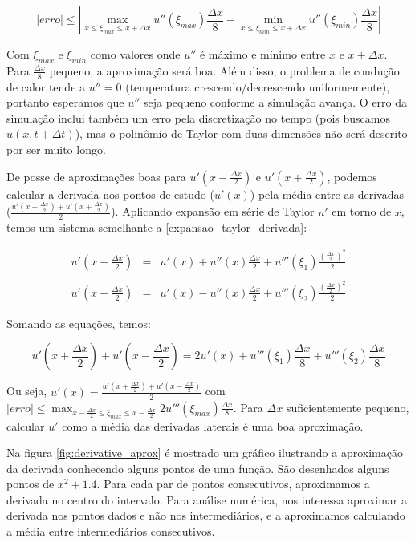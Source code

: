 \documentclass[12pt,fleqn]{article}
\begin{document}
\[|erro| \leq |\max_{x \leq \xi_{max} \leq x + \Delta x} u''(\xi_{max}) \frac{\Delta x}{8} - \min_{x \leq \xi_{min} \leq x + \Delta x} u''(\xi_{min}) \frac{\Delta x}{8}|\]

Com $\xi_{max}$ e $\xi_{min}$ como valores onde $u''$ é máximo e mínimo entre $x$ e $x + \Delta x$. Para $\frac{\Delta x}{8}$ pequeno, a aproximação será boa. Além disso, o problema de condução de calor tende a $u'' = 0$ (temperatura crescendo/decrescendo uniformemente), portanto esperamos que $u''$ seja pequeno conforme a simulação avança. O erro da simulação inclui também um erro pela discretização no tempo (pois buscamos $u(x, t + \Delta t)$), mas o polinômio de Taylor com duas dimensões não será descrito por ser muito longo.

De posse de aproximações boas para $u'(x - \frac{\Delta x}{2})$ e $u'(x + \frac{\Delta x}{2})$, podemos calcular a derivada nos pontos de estudo ($u'(x)$) pela média entre as derivadas ($\frac{u'(x - \frac{\Delta x}{2}) + u'(x + \frac{\Delta x}{2})}{2}$). Aplicando expansão em série de Taylor $u'$ em torno de $x$, temos um sistema semelhante a \ref{expansao_taylor_derivada}:

\begin{equation}
\label{expansao_taylor_derivada_central}
\begin{array}{rcl}
	u'(x + \frac{\Delta x}{2}) & = & u'(x) + u''(x) \frac{\Delta x}{2} + u'''(\xi_1) \frac{(\frac{\Delta x}{2}) ^ 2}{2} \\ \\
	u'(x - \frac{\Delta x}{2}) & = & u'(x) - u''(x) \frac{\Delta x}{2} + u'''(\xi_2) \frac{(\frac{\Delta x}{2}) ^ 2}{2}
\end{array}
\end{equation}

Somando as equações, temos:

\[
u'(x + \frac{\Delta x}{2}) + u'(x - \frac{\Delta x}{2}) = 2u'(x) + u'''(\xi_1) \frac{\Delta x}{8} + u'''(\xi_2) \frac{\Delta x}{8}
\]

Ou seja, $u'(x) = \frac{u'(x + \frac{\Delta x}{2}) + u'(x - \frac{\Delta x}{2})}{2}$ com $|erro| \leq \max_{x - \frac{\Delta x}{2} \leq \xi_{max} \leq x - \frac{\Delta x}{2}} 2u'''(\xi_{max}) \frac{\Delta x}{8}$. Para $\Delta x$ suficientemente pequeno, calcular $u'$ como a média das derivadas laterais é uma boa aproximação.

Na figura \ref{fig:derivative_aprox} é mostrado um gráfico ilustrando a aproximação da derivada conhecendo alguns pontos de uma função. São desenhados alguns pontos de $x^2 + 1.4$. Para cada par de pontos consecutivos, aproximamos a derivada no centro do intervalo. Para análise numérica, nos interessa aproximar a derivada nos pontos dados e não nos intermediários, e a aproximamos calculando a média entre intermediários consecutivos.
\end{document}
